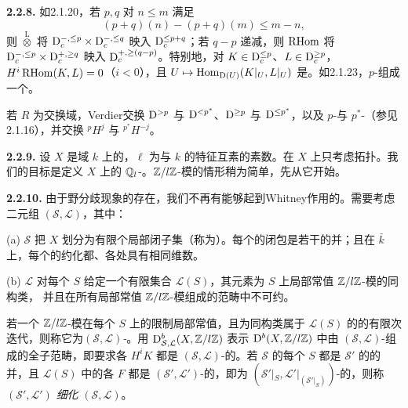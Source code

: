 \par\medskip\noindent\textbf{2.2.8.} 如2.1.20，若 $p,q$ 对 $n\leq m$ 满足
\[
 (p+q)(n)-(p+q)(m)\leq m-n,
\]
则 $\overset{\mathrm L}{\otimes}$ 将 $\mathrm{D}_c^{-,\leq p}\times\mathrm{D}_c^{-,\leq q}$ 映入 $\mathrm{D}_c^{\leq p+q}$；若 $q-p$ 递减，则 $\operatorname{RHom}$ 将 $\mathrm{D}_c^{-,\leq p}\times\mathrm{D}_c^{+,\geq q}$ 映入 $\mathrm{D}_c^{+,\geq(q-p)}$。特别地，对 $K\in\mathrm{D}_c^{\leq p}$、$L\in\mathrm{D}_c^{\geq p}$，$H^i\operatorname{RHom}(K,L)=0$（$i<0$），且 $U\mapsto\operatorname{Hom}_{\mathrm{D}(U)}(K|_U,L|_U)$ 是。如2.1.23，$p$-组成一个。

若 $R$ 为交换域，Verdier交换 $\mathrm{D}^{>p}$ 与 $\mathrm{D}^{<p^*}$、$\mathrm{D}^{\geq p}$ 与 $\mathrm{D}^{\leq p^*}$，以及 $p$-与 $p^*$-（参见2.1.16），并交换 ${}^pH^j$ 与 ${}^{p^*}H^{-j}$。

\par\medskip\noindent\textbf{2.2.9.} 设 $X$ 是域 $k$ 上的，$\ell$ 为与 $k$ 的特征互素的素数。在 $X$ 上只考虑拓扑。我们的目标是定义 $X$ 上的 $\mathbb Q_l$-。$\mathbb Z/l\mathbb Z$-模的情形稍为简单，先从它开始。

\par\medskip\noindent\textbf{2.2.10.} 由于野分歧现象的存在，我们不再有能够起到Whitney作用的。需要考虑二元组 $(\mathcal S,\mathcal L)$，其中：

(a) $\mathcal S$ 把 $X$ 划分为有限个局部闭子集（称为）。每个的闭包是若干的并；且在 $\bar k$ 上，每个的约化都、各处具有相同维数。

(b) $\mathcal L$ 对每个 $S$ 给定一个有限集合 $\mathcal L(S)$，其元素为 $S$ 上局部常值 $\mathbb Z/l\mathbb Z$-模的同构类，
并且在所有局部常值 $\mathbb Z/l\mathbb Z$-模组成的范畴中不可约。

若一个 $\mathbb Z/l\mathbb Z$-模在每个 $S$ 上的限制局部常值，且为同构类属于 $\mathcal L(S)$ 的的有限次迭代，则称它为\emph{$(\mathcal S,\mathcal L)$-}。用 $\mathrm{D}_{\mathcal S,\mathcal L}^b(X,\mathbb Z/l\mathbb Z)$ 表示 $\mathrm{D}^b(X,\mathbb Z/l\mathbb Z)$ 中由 $(\mathcal S,\mathcal L)$-组成的全子范畴，即要求各 $H^iK$ 都是 $(\mathcal S,\mathcal L)$-的。若 $\mathcal S$ 的每个 $S$ 都是 $\mathcal S'$ 的的并，且 $\mathcal L(S)$ 中的各 $F$ 都是 $(\mathcal S',\mathcal L')$-的，即为 $(\mathcal S'|_S,\mathcal L'|_{(\mathcal S'|_S)})$-的，则称 $(\mathcal S',\mathcal L')$ \emph{细化} $(\mathcal S,\mathcal L)$。

